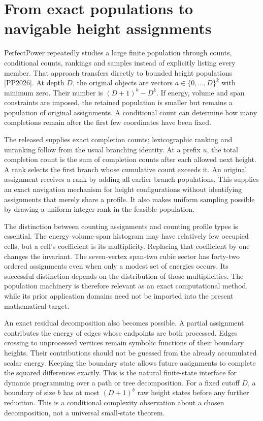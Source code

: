 \documentclass[
  11pt,
  a4paper,
]{report}
\let\singularitytexttt\texttt
\renewcommand{\texttt}[1]{\singularitytexttt{\seqsplit{#1}}}
\begin{document}
\hypertarget{from-exact-populations-to-navigable-height-assignments}{%
\section{From exact populations to navigable height
assignments}\label{from-exact-populations-to-navigable-height-assignments}}

PerfectPower repeatedly studies a large finite population through
counts, conditional counts, rankings and samples instead of explicitly
listing every member. That approach transfers directly to bounded height
populations {[}PP2026{]}. At depth \(D\), the original objects are
vectors \(a\in\{0,\ldots,D\}^k\) with minimum zero. Their number is
\((D+1)^k-D^k\). If energy, volume and span constraints are imposed, the
retained population is smaller but remains a population of original
assignments. A conditional count can determine how many completions
remain after the first few coordinates have been fixed.

The released \texttt{HeightPopulation} supplies exact completion counts;
lexicographic ranking and unranking follow from the usual branching
identity. At a prefix \(u\), the total completion count is the sum of
completion counts after each allowed next height. A rank selects the
first branch whose cumulative count exceeds it. An original assignment
receives a rank by adding all earlier branch populations. This supplies
an exact navigation mechanism for height configurations without
identifying assignments that merely share a profile. It also makes
uniform sampling possible by drawing a uniform integer rank in the
feasible population.

The distinction between counting assignments and counting profile types
is essential. The energy-volume-span histogram may have relatively few
occupied cells, but a cell's coefficient is its multiplicity. Replacing
that coefficient by one changes the invariant. The seven-vertex span-two
cubic sector has forty-two ordered assignments even when only a modest
set of energies occurs. Its successful distinction depends on the
distribution of those multiplicities. The population machinery is
therefore relevant as an exact computational method, while its prior
application domains need not be imported into the present mathematical
target.

An exact residual decomposition also becomes possible. A partial
assignment contributes the energy of edges whose endpoints are both
processed. Edges crossing to unprocessed vertices remain symbolic
functions of their boundary heights. Their contributions should not be
guessed from the already accumulated scalar energy. Keeping the boundary
state allows future assignments to complete the squared differences
exactly. This is the natural finite-state interface for dynamic
programming over a path or tree decomposition. For a fixed cutoff \(D\),
a boundary of size \(b\) has at most \((D+1)^b\) raw height states
before any further reduction. This is a conditional complexity
observation about a chosen decomposition, not a universal small-state
theorem.
\end{document}
